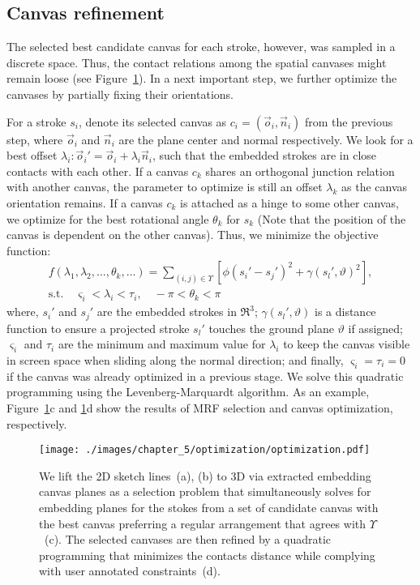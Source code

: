 {\subsection{Canvas refinement}

The selected best candidate canvas for each stroke, however, was sampled in a discrete space. Thus, the contact relations among the spatial canvases might remain loose (see Figure~\ref{fig:optimization}). In a next important step, we further optimize the canvases by partially fixing their orientations.

For a stroke $s_i$, denote its selected canvas as $c_i = (\vec{o}_i, \vec{n}_i)$ from the previous step, where $\vec{o}_i$ and $\vec{n}_i$ are the plane center and normal respectively. We look for a best offset $\lambda_i: \vec{o}_i' = \vec{o}_i + \lambda_i{\vec{n}_i}$, such that the embedded strokes are in close contacts with each other. If a canvas $c_k$ shares an orthogonal junction relation with another canvas, the parameter to optimize is still an offset $\lambda_k$ as the canvas orientation remains. If a canvas $c_k$ is attached as a  hinge to some other canvas, we optimize for the best rotational angle $\theta_k$ for $s_k$ (Note that the position of the canvas is dependent on the other canvas). Thus, we minimize the objective function:
\begin{eqnarray}
f(\lambda_1, \lambda_2, \dots, \theta_k, \dots) = \sum_{(i,j) \in \Upsilon}{[\phi(s_i'-s_j')^2+\gamma(s_l',\vartheta)^2]},  \nonumber \\
\text{s.t.} \quad \varsigma_i < \lambda_i < \tau_i, \quad  -\pi < \theta_k < \pi
\label{eqn:quadratic_programming}
\end{eqnarray}
where, $s_i'$ and $s_j'$ are the embedded strokes in $\Re^3$; $\gamma(s_l',\vartheta)$ is a distance function to ensure a projected stroke $s_l'$ touches the ground plane $\vartheta$ if assigned; $\varsigma_i$ and $\tau_i$ are the minimum and maximum value for $\lambda_i$ to keep the canvas visible in screen space when sliding along the normal direction; and finally, $\varsigma_i = \tau_i = 0$ if the canvas was already optimized in a previous stage. We solve this quadratic programming using the Levenberg-Marquardt algorithm. As an example, Figure~\ref{fig:optimization}c and \ref{fig:optimization}d show the results of MRF selection and canvas optimization, respectively.

\begin{figure}%
  \texttt{[image: ./images/chapter\_5/optimization/optimization.pdf]}
  \caption{We lift the 2D sketch lines~(a), (b) to 3D via extracted embedding canvas planes as a selection problem that simultaneously solves for embedding planes for the stokes from a set of candidate canvas with the best canvas preferring a regular arrangement that agrees with $\Upsilon$~(c). The selected canvases are then refined by a quadratic programming that minimizes the contacts distance while complying with user annotated constraints~(d). }
  \label{fig:optimization}
  \vnudge
\end{figure}

}
